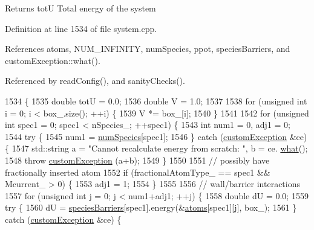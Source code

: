 \begin{DoxyReturn}{Returns}
tot\-U Total energy of the system 
\end{DoxyReturn}


Definition at line 1534 of file system.\-cpp.



References atoms, N\-U\-M\-\_\-\-I\-N\-F\-I\-N\-I\-T\-Y, num\-Species, ppot, species\-Barriers, and custom\-Exception\-::what().



Referenced by read\-Config(), and sanity\-Checks().


\begin{DoxyCode}
1534                                        \{
1535     \textcolor{keywordtype}{double} totU = 0.0;
1536     \textcolor{keywordtype}{double} V = 1.0;
1537 
1538     \textcolor{keywordflow}{for} (\textcolor{keywordtype}{unsigned} \textcolor{keywordtype}{int} i = 0; i < box\_.size(); ++i) \{
1539         V *= box\_[i];
1540     \}
1541 
1542     \textcolor{keywordflow}{for} (\textcolor{keywordtype}{unsigned} \textcolor{keywordtype}{int} spec1 = 0; spec1 < nSpecies\_; ++spec1) \{
1543         \textcolor{keywordtype}{int} num1 = 0, adj1 = 0;
1544         \textcolor{keywordflow}{try} \{
1545             num1 = \hyperlink{classsim_system_a9eea865e6dc1cff377b1e79c4d9c23f0}{numSpecies}[spec1];
1546         \} \textcolor{keywordflow}{catch} (\hyperlink{classcustom_exception}{customException} &ce) \{
1547             std::string a = \textcolor{stringliteral}{"Cannot recalculate energy from scratch: "}, b = ce.
      \hyperlink{classcustom_exception_aeb6ab5848b038adfc68fde86a512f691}{what}();
1548             \textcolor{keywordflow}{throw} \hyperlink{classcustom_exception}{customException} (a+b);
1549         \}
1550 
1551         \textcolor{comment}{// possibly have fractionally inserted atom}
1552         \textcolor{keywordflow}{if} (fractionalAtomType\_ == spec1 && Mcurrent\_ > 0) \{
1553             adj1 = 1;
1554         \}
1555 
1556         \textcolor{comment}{// wall/barrier interactions}
1557         \textcolor{keywordflow}{for} (\textcolor{keywordtype}{unsigned} \textcolor{keywordtype}{int} j = 0; j < num1+adj1; ++j) \{
1558             \textcolor{keywordtype}{double} dU = 0.0;
1559             \textcolor{keywordflow}{try} \{
1560                 dU = \hyperlink{classsim_system_a5ae652ff4519f39c3862abae32a9581b}{speciesBarriers}[spec1].energy(&\hyperlink{classsim_system_a90421b19082f7fb8fc23b7264b1161e4}{atoms}[spec1][j], box\_);
1561             \} \textcolor{keywordflow}{catch} (\hyperlink{classcustom_exception}{customException} &ce) \{

\end{DoxyCode}
